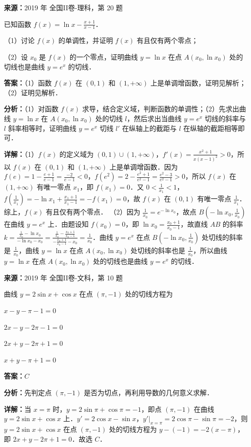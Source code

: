 \begin{question}[points=12]
\textbf{来源：}2019 年 全国II卷-理科，第 20 题\par
已知函数 $f(x)=\ln x-\frac{x+1}{x-1}$．

（1）讨论 $f(x)$ 的单调性，并证明 $f(x)$ 有且仅有两个零点；

（2）设 $x_0$ 是 $f(x)$ 的一个零点，证明曲线 $y=\ln x$ 在点 $A(x_0,\ln x_0)$ 处的切线也是曲线 $y=e^x$ 的切线．
\begin{solution}
\textbf{答案：}（1）函数 $f(x)$ 在 $(0,1)$ 和 $(1,+\infty)$ 上是单调增函数，证明见解析；（2）证明见解析．

\textbf{分析：}（1）对函数 $f(x)$ 求导，结合定义域，判断函数的单调性；（2）先求出曲线 $y=\ln x$ 在 $A(x_0,\ln x_0)$ 处的切线 $l$，然后求出当曲线 $y=e^x$ 切线的斜率与 $l$ 斜率相等时，证明曲线 $y=e^x$ 切线 $l'$ 在纵轴上的截距与 $l$ 在纵轴的截距相等即可．

\textbf{详解：}（1）$f(x)$ 的定义域为 $(0,1)\cup(1,+\infty)$，$f'(x)=\frac{x^2+1}{x(x-1)^2}>0$，所以 $f(x)$ 在 $(0,1)$ 和 $(1,+\infty)$ 上是单调增函数．因为 $f(e)=1-\frac{e+1}{e-1}=\frac{-2}{e-1}<0$，$f(e^2)=2-\frac{e^2+1}{e^2-1}=\frac{e^2-3}{e^2-1}>0$，所以 $f(x)$ 在 $(1,+\infty)$ 有唯一零点 $x_1$，即 $f(x_1)=0$．又 $0<\frac{1}{x_1}<1$，$f(\frac{1}{x_1})=-\ln x_1+\frac{x_1+1}{x_1-1}=-f(x_1)=0$，故 $f(x)$ 在 $(0,1)$ 有唯一零点 $\frac{1}{x_1}$．综上，$f(x)$ 有且仅有两个零点．
（2）因为 $\frac{1}{x_0}=e^{-\ln x_0}$，故点 $B(-\ln x_0,\frac{1}{x_0})$ 在曲线 $y=e^x$ 上．由题设知 $f(x_0)=0$，即 $\ln x_0=\frac{x_0+1}{x_0-1}$，故直线 $AB$ 的斜率 $k=\frac{\frac{1}{x_0}-\ln x_0}{-\ln x_0-x_0}=\frac{\frac{1}{x_0}-\frac{x_0+1}{x_0-1}}{-\frac{x_0+1}{x_0-1}-x_0}=\frac{1}{x_0}$．曲线 $y=e^x$ 在点 $B(-\ln x_0,\frac{1}{x_0})$ 处切线的斜率是 $\frac{1}{x_0}$，曲线 $y=\ln x$ 在点 $A(x_0,\ln x_0)$ 处切线的斜率也是 $\frac{1}{x_0}$，所以曲线 $y=\ln x$ 在点 $A(x_0,\ln x_0)$ 处的切线也是曲线 $y=e^x$ 的切线．
\end{solution}
\end{question}

\begin{question}[points=5]
\textbf{来源：}2019 年 全国II卷-文科，第 10 题\par
曲线 $y=2\sin x+\cos x$ 在点 $(\pi,-1)$ 处的切线方程为
\begin{choices}
  \item $x-y-\pi-1=0$
  \item $2x-y-2\pi-1=0$
  \item $2x+y-2\pi+1=0$
  \item $x+y-\pi+1=0$
\end{choices}
\begin{solution}
\textbf{答案：}$C$

\textbf{分析：}先判定点 $(\pi,-1)$ 是否为切点，再利用导数的几何意义求解．

\textbf{详解：}当 $x=\pi$ 时，$y=2\sin\pi+\cos\pi=-1$，即点 $(\pi,-1)$ 在曲线 $y=2\sin x+\cos x$ 上．$y'=2\cos x-\sin x$，$y'|_{x=\pi}=2\cos\pi-\sin\pi=-2$，则 $y=2\sin x+\cos x$ 在点 $(\pi,-1)$ 处的切线方程为 $y-(-1)=-2(x-\pi)$，即 $2x+y-2\pi+1=0$．故选 $C$．
\end{solution}
\end{question}

